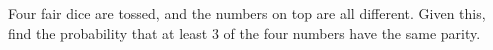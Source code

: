 Four fair dice are tossed, and the numbers on top are all different. Given this, find the probability that at least $3$ of the four numbers have the same parity.
